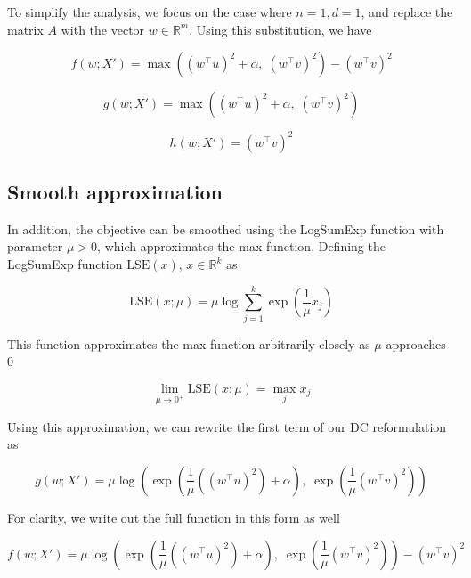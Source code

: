 \documentclass[11pt]{article}
\begin{document}
To simplify the analysis, we focus on the case where $n = 1, d = 1$, and replace the matrix $A$ with the vector $w \in \mathbb{R}^m$. Using this substitution, we have

\begin{equation}
\label{eq:full_orig_margin_f}
    f(w; X') = \max((w^{\top} u)^2 + \alpha, \; (w^{\top} v)^2) - (w^{\top} v)^2
\end{equation}

\begin{equation}
    g(w; X') = \max((w^{\top} u)^2 + \alpha, \; (w^{\top} v)^2)
\end{equation}

\begin{equation}
    h(w; X') = (w^{\top} v)^2
\end{equation}

\subsection{Smooth approximation}

In addition, the objective can be smoothed using the LogSumExp function with parameter $\mu > 0$, which approximates the max function. Defining the LogSumExp function $\textrm{LSE}(x)$, $x \in \mathbb{R}^k$ as

\begin{equation}
    \textrm{LSE}(x; \mu) = \mu \log \sum_{j=1}^{k} \exp(\frac{1}{\mu}x_j)
\end{equation}

This function approximates the max function arbitrarily closely as $\mu$ approaches $0$

\begin{equation}
    \lim_{\mu \to 0^+}  \textrm{LSE}(x; \mu) = \max_j x_j
\end{equation}

Using this approximation, we can rewrite the first term of our DC reformulation as

\begin{equation}
    g(w; X') = \mu \log(\exp(\frac{1}{\mu}((w^{\top} u)^2) + \alpha), \; \exp(\frac{1}{\mu}(w^{\top} v)^2))
\end{equation}

For clarity, we write out the full function in this form as well

\begin{equation}
\label{eq:full_smooth_margin_f}
    f(w; X') = \mu \log(\exp(\frac{1}{\mu}((w^{\top} u)^2) + \alpha), \; \exp(\frac{1}{\mu}(w^{\top} v)^2)) - (w^{\top} v)^2
\end{equation}
\end{document}
